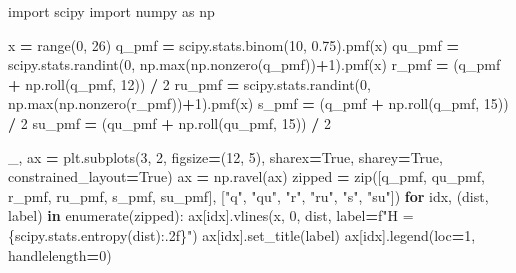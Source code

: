 \documentclass[
  10pt,
  italian,
  a4paper,
  extrafontsizes,onecolumn,openright
  ]{memoir}
\newenvironment{Shaded}{\begin{snugshade}}{\end{snugshade}}
\newcommand{\BuiltInTok}[1]{#1}
\newcommand{\ControlFlowTok}[1]{\textcolor[rgb]{0.13,0.29,0.53}{\textbf{#1}}}
\newcommand{\DecValTok}[1]{\textcolor[rgb]{0.00,0.00,0.81}{#1}}
\newcommand{\FloatTok}[1]{\textcolor[rgb]{0.00,0.00,0.81}{#1}}
\newcommand{\ImportTok}[1]{#1}
\newcommand{\KeywordTok}[1]{\textcolor[rgb]{0.13,0.29,0.53}{\textbf{#1}}}
\newcommand{\NormalTok}[1]{#1}
\newcommand{\OperatorTok}[1]{\textcolor[rgb]{0.81,0.36,0.00}{\textbf{#1}}}
\newcommand{\SpecialCharTok}[1]{\textcolor[rgb]{0.00,0.00,0.00}{#1}}
\newcommand{\SpecialStringTok}[1]{\textcolor[rgb]{0.31,0.60,0.02}{#1}}
\newcommand{\StringTok}[1]{\textcolor[rgb]{0.31,0.60,0.02}{#1}}
\newcommand{\VariableTok}[1]{\textcolor[rgb]{0.00,0.00,0.00}{#1}}
\theoremstyle{definition}
\theoremstyle{definition}
\theoremstyle{definition}
\theoremstyle{definition}
\theoremstyle{remark}
\begin{document}
\begin{Shaded}
\begin{Highlighting}[]
\ImportTok{import}\NormalTok{ scipy}
\ImportTok{import}\NormalTok{ numpy }\ImportTok{as}\NormalTok{ np}

\NormalTok{x }\OperatorTok{=} \BuiltInTok{range}\NormalTok{(}\DecValTok{0}\NormalTok{, }\DecValTok{26}\NormalTok{)}
\NormalTok{q\_pmf }\OperatorTok{=}\NormalTok{ scipy.stats.binom(}\DecValTok{10}\NormalTok{, }\FloatTok{0.75}\NormalTok{).pmf(x)}
\NormalTok{qu\_pmf }\OperatorTok{=}\NormalTok{ scipy.stats.randint(}\DecValTok{0}\NormalTok{, np.}\BuiltInTok{max}\NormalTok{(np.nonzero(q\_pmf))}\OperatorTok{+}\DecValTok{1}\NormalTok{).pmf(x) }
\NormalTok{r\_pmf }\OperatorTok{=}\NormalTok{ (q\_pmf }\OperatorTok{+}\NormalTok{ np.roll(q\_pmf, }\DecValTok{12}\NormalTok{)) }\OperatorTok{/} \DecValTok{2}
\NormalTok{ru\_pmf }\OperatorTok{=}\NormalTok{ scipy.stats.randint(}\DecValTok{0}\NormalTok{, np.}\BuiltInTok{max}\NormalTok{(np.nonzero(r\_pmf))}\OperatorTok{+}\DecValTok{1}\NormalTok{).pmf(x) }
\NormalTok{s\_pmf }\OperatorTok{=}\NormalTok{ (q\_pmf }\OperatorTok{+}\NormalTok{ np.roll(q\_pmf, }\DecValTok{15}\NormalTok{)) }\OperatorTok{/} \DecValTok{2}
\NormalTok{su\_pmf }\OperatorTok{=}\NormalTok{ (qu\_pmf }\OperatorTok{+}\NormalTok{ np.roll(qu\_pmf, }\DecValTok{15}\NormalTok{)) }\OperatorTok{/} \DecValTok{2}

\NormalTok{\_, ax }\OperatorTok{=}\NormalTok{ plt.subplots(}\DecValTok{3}\NormalTok{, }\DecValTok{2}\NormalTok{, figsize}\OperatorTok{=}\NormalTok{(}\DecValTok{12}\NormalTok{, }\DecValTok{5}\NormalTok{), sharex}\OperatorTok{=}\VariableTok{True}\NormalTok{, sharey}\OperatorTok{=}\VariableTok{True}\NormalTok{,}
\NormalTok{  constrained\_layout}\OperatorTok{=}\VariableTok{True}\NormalTok{)}
\NormalTok{ax }\OperatorTok{=}\NormalTok{ np.ravel(ax)}
\NormalTok{zipped }\OperatorTok{=} \BuiltInTok{zip}\NormalTok{([q\_pmf, qu\_pmf, r\_pmf, ru\_pmf, s\_pmf, su\_pmf], }
\NormalTok{  [}\StringTok{"q"}\NormalTok{, }\StringTok{"qu"}\NormalTok{, }\StringTok{"r"}\NormalTok{, }\StringTok{"ru"}\NormalTok{, }\StringTok{"s"}\NormalTok{, }\StringTok{"su"}\NormalTok{])}
\ControlFlowTok{for}\NormalTok{ idx, (dist, label) }\KeywordTok{in} \BuiltInTok{enumerate}\NormalTok{(zipped):}
\NormalTok{    ax[idx].vlines(x, }\DecValTok{0}\NormalTok{, dist, label}\OperatorTok{=}\SpecialStringTok{f"H = }\SpecialCharTok{\{}\NormalTok{scipy}\SpecialCharTok{.}\NormalTok{stats}\SpecialCharTok{.}\NormalTok{entropy(dist)}\SpecialCharTok{:.2f\}}\SpecialStringTok{"}\NormalTok{) }
\NormalTok{    ax[idx].set\_title(label)}
\NormalTok{    ax[idx].legend(loc}\OperatorTok{=}\DecValTok{1}\NormalTok{, handlelength}\OperatorTok{=}\DecValTok{0}\NormalTok{)}
\end{Highlighting}
\end{Shaded}
\end{document}
